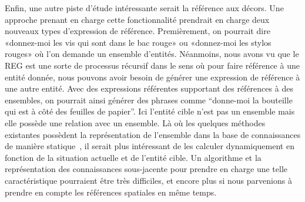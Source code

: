 Enfin, une autre piste d'étude intéressante serait la référence aux décors. Une approche prenant en charge cette fonctionnalité prendrait en charge deux nouveaux types d'expression de référence. Premièrement, on pourrait dire «donnez-moi les vis qui sont dans le bac rouge» ou «donnez-moi les stylos rouges» où l'on demande un ensemble d'entités. Néanmoins, nous avons vu que le REG est une sorte de processus récursif dans le sens où pour faire référence à une entité donnée, nous pouvons avoir besoin de générer une expression de référence à une autre entité. Avec des expressions référentes supportant des références à des ensembles, on pourrait ainsi générer des phrases comme ``donne-moi la bouteille qui est à côté des feuilles de papier''. Ici l'entité cible n'est pas un ensemble mais elle possède une relation avec un ensemble. Là où les quelques méthodes existantes possèdent la représentation de l'ensemble dans la base de connaissances de manière statique~\cite{fang_2013_towards}, il serait plus intéressant de les calculer dynamiquement en fonction de la situation actuelle et de l'entité cible. Un algorithme et la représentation des connaissances sous-jacente pour prendre en charge une telle caractéristique pourraient être très difficiles, et encore plus si nous parvenions à prendre en compte les références spatiales en même temps. 